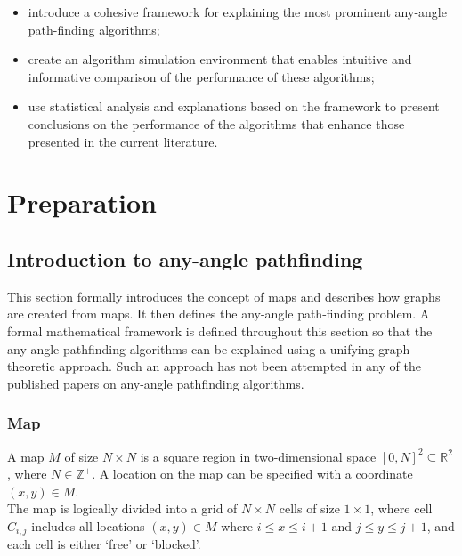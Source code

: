 \documentclass[12pt,notitlepage]{report}
\begin{document}
\begin{itemize}
\item introduce a cohesive framework for explaining the most prominent any-angle path-finding algorithms;
\item create an algorithm simulation environment that enables intuitive and informative comparison of the performance of these algorithms;
\item use statistical analysis and explanations based on the framework to present conclusions on the performance of the algorithms that enhance those presented in the current literature.
\end {itemize}

\cleardoublepage


\chapter{Preparation} 

\section{Introduction to any-angle pathfinding}

This section formally introduces the concept of maps and describes how graphs are created from maps. It then defines the any-angle path-finding problem. A formal mathematical framework is defined throughout this section so that the any-angle pathfinding algorithms can be explained using a unifying graph-theoretic approach. Such an approach has not been attempted in any of the published papers on any-angle pathfinding algorithms.

\subsection{Map}

A map $M$ of size $N \times N$ is a square region in two-dimensional space $[0,N]^{2} \subseteq \mathbb{R}^{2}$, where $N \in\mathbb{Z^+}$. A location on the map can be specified with a coordinate $(x,y) \in M$.\\

\noindent
The map is logically divided into a grid of $N \times N$ cells of size $1 \times 1$, where cell $C_{i,j}$ includes all locations $(x,y) \in M$ where $i \leq x \leq i+1$ and $j \leq y \leq j+1$, and each cell is either `free' or `blocked'.\\
\end{document}

